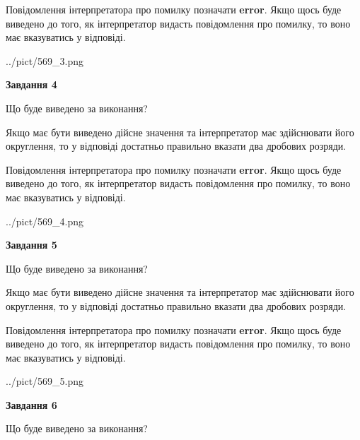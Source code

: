 \documentclass[12pt, ukrainian]{article}
\begin{document}
{\begin {Large}
Повідомлення інтерпретатора про помилку позначати \textbf{error}.
Якщо щось буде виведено до того, як інтерпретатор видасть повідомлення про помилку, 
то воно має вказуватись у відповіді. \par

\begin{center}
	{../pict/569_3.png}
\end{center}
\newpage

{\begin {center}\textbf{Завдання 4}\end {center}}\par
Що буде виведено за виконання? \par

Якщо має бути виведено дійсне значення та інтерпретатор має здійснювати його округлення, 
то у відповіді достатньо правильно вказати два дробових розряди.

Повідомлення інтерпретатора про помилку позначати \textbf{error}.
Якщо щось буде виведено до того, як інтерпретатор видасть повідомлення про помилку, 
то воно має вказуватись у відповіді. \par

\begin{center}
	{../pict/569_4.png}
\end{center}
\newpage

{\begin {center}\textbf{Завдання 5}\end {center}}\par
Що буде виведено за виконання? \par

Якщо має бути виведено дійсне значення та інтерпретатор має здійснювати його округлення, 
то у відповіді достатньо правильно вказати два дробових розряди.

Повідомлення інтерпретатора про помилку позначати \textbf{error}.
Якщо щось буде виведено до того, як інтерпретатор видасть повідомлення про помилку, 
то воно має вказуватись у відповіді. \par

\begin{center}
	{../pict/569_5.png}
\end{center}
\newpage

{\begin {center}\textbf{Завдання 6}\end {center}}\par
Що буде виведено за виконання? \par


\end{Large}}
\end{document}
